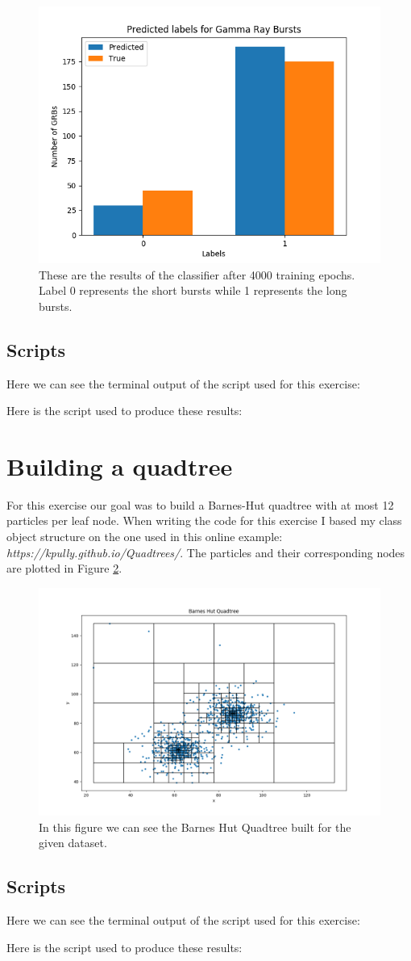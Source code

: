 \documentclass[a4paper,10pt]{article}
\begin{document}
\begin{figure}[h!]
  \centering
  \includegraphics[width=0.7\linewidth]{./plots/6.png}
  \caption{These are the results of the classifier after 4000 training epochs. Label 0 represents the short bursts while 1 represents the long bursts.}
  \label{fig:6}
\end{figure}

\subsection{Scripts}

Here we can see the terminal output of the script used for this exercise:


Here is the script used to produce these results: 


\section{Building a quadtree}

For this exercise our goal was to build a Barnes-Hut quadtree with at most 12 particles per leaf node. When writing the code for this exercise I based my class object structure on the one used in this online example: \textit{https://kpully.github.io/Quadtrees/}. The particles and their corresponding nodes are plotted in Figure \ref{fig:7}.

\begin{figure}[h!]
  \centering
  \includegraphics[width=0.8\linewidth]{./plots/7.png}
  \caption{In this figure we can see the Barnes Hut Quadtree built for the given dataset.}
  \label{fig:7}
\end{figure}

\subsection{Scripts}

Here we can see the terminal output of the script used for this exercise:


Here is the script used to produce these results: 

\end{document}
